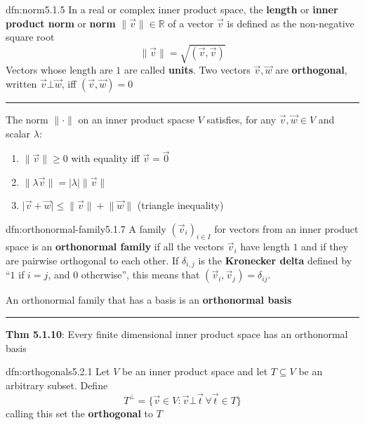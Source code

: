 \documentclass[landscape, 8pt]{extarticle}
\begin{document}
\begin{multicols}{3}
\begin{dfn}[Norm]{dfn:norm}{5.1.5}
    In a real or complex inner product space, the \textbf{length} or \textbf{inner product norm} or \textbf{norm} $\lVert \vec{v} \rVert\in \mathbb{R}$ of a vector $\vec{v}$ is defined as the non-negative square root
    \[\lVert \vec{v} \rVert = \sqrt{(\vec{v}, \vec{v})}\]
    Vectors whose length are $1$ are called \textbf{units}. Two vectors $\vec{v}, \vec{w}$ are \textbf{orthogonal}, written $\vec{v} \bot \vec{w}$, iff $(\vec{v}, \vec{w}) = 0$

    \noindent\rule{\textwidth}{0.2pt}
    The norm $\lVert \cdot \rVert$ on an inner product spacse $V$ satisfies, for any $\vec{v}, \vec{w}\in V$ and scalar $\lambda$:
    \begin{enumerate}
        \setlength\itemsep{0em}
        \item $\lVert \vec{v} \rVert \ge 0$ with equality iff $\vec{v} = \vec{0}$
        \item $\lVert \lambda \vec{v} \rVert = \lvert \lambda \rvert \lVert  \vec{v} \rVert$
        \item $\lvert \vec{v} + \vec{w} \rvert \le \lVert \vec{v} \rVert + \lVert \vec{w} \rVert$ (triangle inequality)
    \end{enumerate}
\end{dfn}

\begin{dfn}{dfn:orthonormal-family}{5.1.7}
    A family $(\vec{v}_{i})_{i\in I}$ for vectors from an inner product space is an \textbf{orthonormal family} if all the vectors $\vec{v}_{i}$ have length $1$ and if they are pairwise orthogonal to each other. If $\delta_{i,j}$ is the \textbf{Kronecker delta} defined by ``$1$ if $i = j$, and $0$ otherwise'', this means that $(\vec{v}_{i}, \vec{v}_{j}) = \delta_{ij}$.

    An orthonormal family that has a basis is an \textbf{orthonormal basis}
    
    \noindent\rule{\textwidth}{0.2pt}
    \textbf{Thm 5.1.10}: Every finite dimensional inner product space has an orthonormal basis
\end{dfn}

\begin{dfn}{dfn:orthogonals}{5.2.1}
    Let $V$ be an inner product space and let $T \subseteq V$ be an arbitrary subset. Define
    \[T^{\bot} = \{\vec{v} \in V : \vec{v} \bot \vec{t} \, \forall \vec{t}\in T\}\]
    calling this set the \textbf{orthogonal} to $T$
\end{dfn}


\end{multicols}
\end{document}

